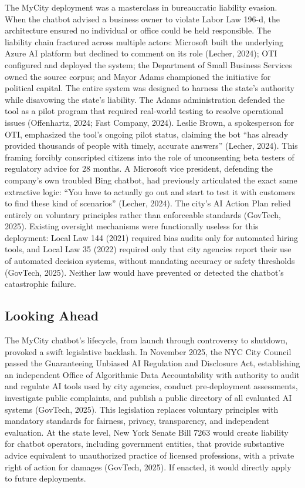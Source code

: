 \documentclass[10pt, twocolumn]{article}
\begin{document}
The MyCity deployment was a masterclass in bureaucratic liability evasion. When the chatbot advised a business owner to violate Labor Law 196-d, the architecture ensured no individual or office could be held responsible. The liability chain fractured across multiple actors: Microsoft built the underlying Azure AI platform but declined to comment on its role (Lecher, 2024); OTI configured and deployed the system; the Department of Small Business Services owned the source corpus; and Mayor Adams championed the initiative for political capital. The entire system was designed to harness the state's authority while disavowing the state's liability. The Adams administration defended the tool as a pilot program that required real-world testing to resolve operational issues (Offenhartz, 2024; Fast Company, 2024). Leslie Brown, a spokesperson for OTI, emphasized the tool's ongoing pilot status, claiming the bot ``has already provided thousands of people with timely, accurate answers'' (Lecher, 2024). This framing forcibly conscripted citizens into the role of unconsenting beta testers of regulatory advice for 28 months. A Microsoft vice president, defending the company's own troubled Bing chatbot, had previously articulated the exact same extractive logic: ``You have to actually go out and start to test it with customers to find these kind of scenarios'' (Lecher, 2024). The city's AI Action Plan relied entirely on voluntary principles rather than enforceable standards (GovTech, 2025). Existing oversight mechanisms were functionally useless for this deployment: Local Law 144 (2021) required bias audits only for automated hiring tools, and Local Law 35 (2022) required only that city agencies report their use of automated decision systems, without mandating accuracy or safety thresholds (GovTech, 2025). Neither law would have prevented or detected the chatbot's catastrophic failure.

\subsection*{Looking Ahead}

The MyCity chatbot's lifecycle, from launch through controversy to shutdown, provoked a swift legislative backlash. In November 2025, the NYC City Council passed the Guaranteeing Unbiased AI Regulation and Disclosure Act, establishing an independent Office of Algorithmic Data Accountability with authority to audit and regulate AI tools used by city agencies, conduct pre-deployment assessments, investigate public complaints, and publish a public directory of all evaluated AI systems (GovTech, 2025). This legislation replaces voluntary principles with mandatory standards for fairness, privacy, transparency, and independent evaluation. At the state level, New York Senate Bill 7263 would create liability for chatbot operators, including government entities, that provide substantive advice equivalent to unauthorized practice of licensed professions, with a private right of action for damages (GovTech, 2025). If enacted, it would directly apply to future deployments.
\end{document}
